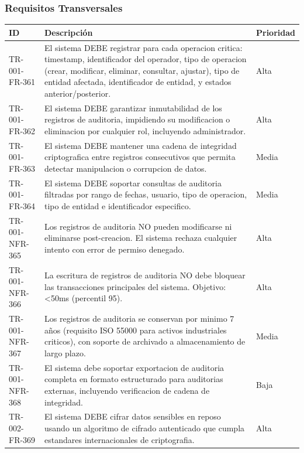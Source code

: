 \subsubsection{Requisitos Transversales}
\footnotesize
\begin{longtable}{>{\raggedright\arraybackslash}p{} >{\raggedright\arraybackslash}p{} >{\raggedright\arraybackslash}p{}}
\toprule
\rowcolor{gray!15}\textbf{ID} & \textbf{Descripción} & \textbf{Prioridad} \\ \midrule
\endhead
TR-001-FR-361 & El sistema DEBE registrar para cada operacion critica: timestamp, identificador del operador, tipo de operacion (crear, modificar, eliminar, consultar, ajustar), tipo de entidad afectada, identificador de entidad, y estados anterior/posterior. & Alta \\
TR-001-FR-362 & El sistema DEBE garantizar inmutabilidad de los registros de auditoria, impidiendo su modificacion o eliminacion por cualquier rol, incluyendo administrador. & Alta \\
TR-001-FR-363 & El sistema DEBE mantener una cadena de integridad criptografica entre registros consecutivos que permita detectar manipulacion o corrupcion de datos. & Media \\
TR-001-FR-364 & El sistema DEBE soportar consultas de auditoria filtradas por rango de fechas, usuario, tipo de operacion, tipo de entidad e identificador especifico. & Media \\
TR-001-NFR-365 & Los registros de auditoria NO pueden modificarse ni eliminarse post-creacion. El sistema rechaza cualquier intento con error de permiso denegado. & Alta \\
TR-001-NFR-366 & La escritura de registros de auditoria NO debe bloquear las transacciones principales del sistema. Objetivo: <50ms (percentil 95). & Alta \\
TR-001-NFR-367 & Los registros de auditoria se conservan por minimo 7 años (requisito ISO 55000 para activos industriales criticos), con soporte de archivado a almacenamiento de largo plazo. & Media \\
TR-001-NFR-368 & El sistema debe soportar exportacion de auditoria completa en formato estructurado para auditorias externas, incluyendo verificacion de cadena de integridad. & Baja \\
TR-002-FR-369 & El sistema DEBE cifrar datos sensibles en reposo usando un algoritmo de cifrado autenticado que cumpla estandares internacionales de criptografia. & Alta \\

\end{longtable}
